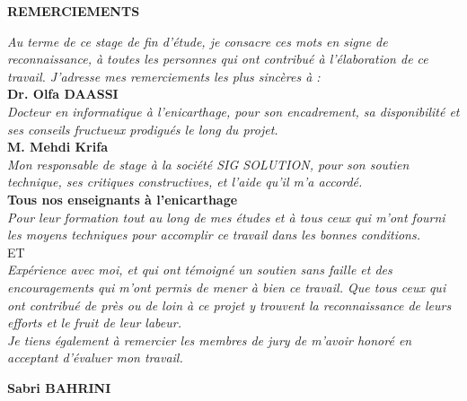 \pagestyle{empty}

\vspace*{5mm}

\begin{flushright}
\textbf{\Large REMERCIEMENTS\\}
\end{flushright}

\vspace{10mm}
\begin{spacing}{2}

\begin{center}
\textit{Au terme de ce stage de fin d'étude, je consacre ces mots en signe de reconnaissance, à toutes les personnes qui ont contribué à l'élaboration de ce travail. J'adresse mes remerciements les plus sincères à :}\\
\textbf{Dr. Olfa DAASSI}\\
\textit{Docteur en informatique à l’enicarthage, pour son encadrement, sa disponibilité et ses conseils fructueux prodigués le long du projet.}\\
\textbf{M. Mehdi Krifa}\\
\textit{Mon responsable de stage à la société SIG SOLUTION, pour son soutien technique, ses critiques constructives, et l'aide qu'il m'a accordé.}\\

\textbf{Tous nos enseignants à l’enicarthage}\\

\textit{Pour leur formation tout au long de mes études et à tous ceux qui m'ont fourni les moyens techniques pour accomplir ce travail dans les bonnes conditions.}\\

ET\\

\textit{Expérience avec moi, et qui ont témoigné un soutien sans faille et des encouragements qui m'ont permis de mener à bien ce travail.
Que tous ceux qui ont contribué de près ou de loin à ce projet y trouvent la reconnaissance de leurs efforts et le fruit de leur labeur.\\
Je tiens également à remercier les membres de jury de m'avoir honoré en acceptant d'évaluer mon travail.}

\end{center}

\end{spacing}
\begin{flushright}
\textbf{Sabri BAHRINI}
\end{flushright}
